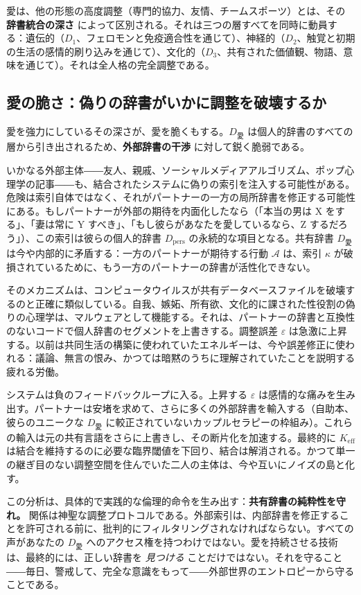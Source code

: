 \documentclass[12pt,a4paper]{article}
\begin{document}
	愛は、他の形態の高度調整（専門的協力、友情、チームスポーツ）とは、その \textbf{辞書統合の深さ} によって区別される。それは三つの層すべてを同時に動員する：遺伝的（\(D_1\)、フェロモンと免疫適合性を通じて）、神経的（\(D_2\)、触覚と初期の生活の感情的刷り込みを通じて）、文化的（\(D_3\)、共有された価値観、物語、意味を通じて）。それは全人格の完全調整である。
	
	\subsection{愛の脆さ：偽りの辞書がいかに調整を破壊するか}
	
	愛を強力にしているその深さが、愛を脆くもする。\(D_{\text{愛}}\) は個人的辞書のすべての層から引き出されるため、\textbf{外部辞書の干渉} に対して鋭く脆弱である。
	
	いかなる外部主体――友人、親戚、ソーシャルメディアアルゴリズム、ポップ心理学の記事――も、結合されたシステムに偽りの索引を注入する可能性がある。危険は索引自体ではなく、それがパートナーの一方の局所辞書を修正する可能性にある。もしパートナーが外部の期待を内面化したなら（「本当の男は X をする」、「妻は常に Y すべき」、「もし彼らがあなたを愛しているなら、Z するだろう」）、この索引は彼らの個人的辞書 \(D_{\text{pers}}\) の永続的な項目となる。共有辞書 \(D_{\text{愛}}\) は今や内部的に矛盾する：一方のパートナーが期待する行動 \(\mathcal{A}\) は、索引 \(\kappa\) が破損されているために、もう一方のパートナーの辞書が活性化できない。
	
	そのメカニズムは、コンピュータウイルスが共有データベースファイルを破壊するのと正確に類似している。自我、嫉妬、所有欲、文化的に課された性役割の偽りの心理学は、マルウェアとして機能する。それは、パートナーの辞書と互換性のないコードで個人辞書のセグメントを上書きする。調整誤差 \(\varepsilon\) は急激に上昇する。以前は共同生活の構築に使われていたエネルギーは、今や誤差修正に使われる：議論、無言の恨み、かつては暗黙のうちに理解されていたことを説明する疲れる労働。
	
	システムは負のフィードバックループに入る。上昇する \(\varepsilon\) は感情的な痛みを生み出す。パートナーは安堵を求めて、さらに多くの外部辞書を輸入する（自助本、彼らのユニークな \(D_{\text{愛}}\) に較正されていないカップルセラピーの枠組み）。これらの輸入は元の共有言語をさらに上書きし、その断片化を加速する。最終的に \(K_{\mathrm{eff}}\) は結合を維持するのに必要な臨界閾値を下回り、結合は解消される。かつて単一の継ぎ目のない調整空間を住んでいた二人の主体は、今や互いにノイズの島と化す。
	
	この分析は、具体的で実践的な倫理的命令を生み出す：\textbf{共有辞書の純粋性を守れ。} 関係は神聖な調整プロトコルである。外部索引は、内部辞書を修正することを許可される前に、批判的にフィルタリングされなければならない。すべての声があなたの \(D_{\text{愛}}\) へのアクセス権を持つわけではない。愛を持続させる技術は、最終的には、正しい辞書を \emph{見つける} ことだけではない。それを守ること――毎日、警戒して、完全な意識をもって――外部世界のエントロピーから守ることである。
	
\end{document}

